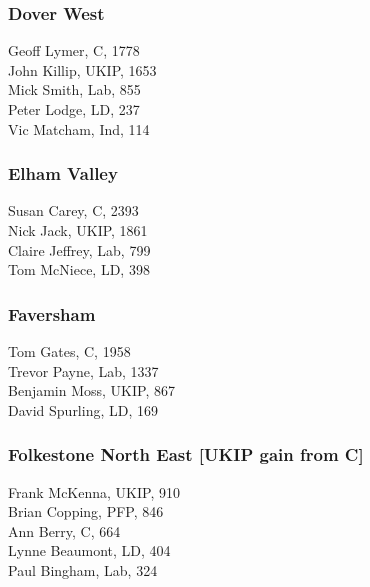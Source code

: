 \documentclass[a4paper,openany,10pt]{book}
\begin{document}
\subsubsection*{Dover West}



Geoff Lymer, C, 1778\\
John Killip, UKIP, 1653\\
Mick Smith, Lab, 855\\
Peter Lodge, LD, 237\\
Vic Matcham, Ind, 114\\


\subsubsection*{Elham Valley}



Susan Carey, C, 2393\\
Nick Jack, UKIP, 1861\\
Claire Jeffrey, Lab, 799\\
Tom McNiece, LD, 398\\


\subsubsection*{Faversham}



Tom Gates, C, 1958\\
Trevor Payne, Lab, 1337\\
Benjamin Moss, UKIP, 867\\
David Spurling, LD, 169\\


\subsubsection*{Folkestone North East \hspace*{\fill}\nolinebreak[1]%
\enspace\hspace*{\fill}
[UKIP gain from C]}



Frank McKenna, UKIP, 910\\
Brian Copping, PFP, 846\\
Ann Berry, C, 664\\
Lynne Beaumont, LD, 404\\
Paul Bingham, Lab, 324\\
\end{document}
